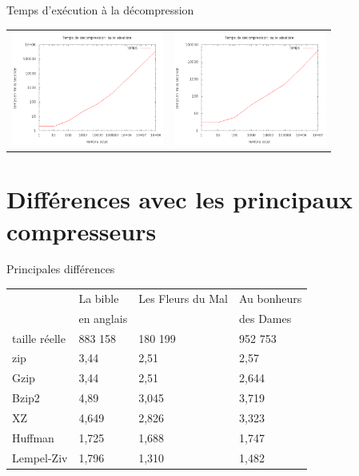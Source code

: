 \documentclass[french]{beamer}
\begin{document}
\begin{frame}{Temps d'exécution à la décompression}
	\begin{center}
	
\begin{tabular}{l | l}
	\includegraphics[width=5cm]{tempsDhA.png} & 
	\includegraphics[width=5cm]{tempsDlzA.png}
	\end{tabular}	
	\end{center}
\end{frame}


\section{Différences avec les principaux compresseurs}
\begin{frame}{Principales différences}
	\begin{flushleft}
\begin{tabular}{|l|l|l|l|}
\hline
 & La bible & Les Fleurs du Mal  & Au bonheurs \\
 & en anglais & & des Dames \\ 
\hline
taille réelle & 883 158 & 180 199 & 952 753  \\\hline
zip & 3,44 & 2,51 & 2,57  \\
\hline
Gzip & 3,44 & 2,51 & 2,644 \\
\hline
Bzip2 & 4,89 & 3,045 & 3,719 \\
\hline
XZ & 4,649 & 2,826 & 3,323 \\
\hline
Huffman & 1,725 & 1,688 & 1,747  \\
\hline
Lempel-Ziv & 1,796 & 1,310 & 1,482 \\
\hline

\end{tabular}
\end{flushleft}
\end{frame}
\end{document}
